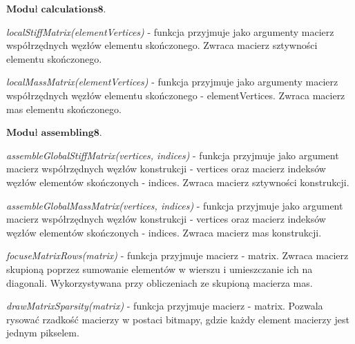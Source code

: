 \vspace {3mm}
 \( \textbf{Moduł calculations8} \).

\vspace {3mm}
\textit{localStiffMatrix(elementVertices)} - funkcja przyjmuje jako argumenty macierz współrzędnych węzłów elementu skończonego. Zwraca macierz sztywności elementu skończonego.

\vspace {3mm}
\textit{localMassMatrix(elementVertices)} - funkcja przyjmuje jako argumenty macierz współrzędnych węzłów elementu skończonego - elementVertices. Zwraca macierz mas elementu skończonego.

\vspace {3mm}
 \( \textbf{Moduł assembling8} \).

\vspace {3mm}
\textit{assembleGlobalStiffMatrix(vertices, indices)} - funkcja przyjmuje jako argument macierz współrzędnych węzłów konstrukcji - vertices oraz macierz indeksów węzłów elementów skończonych - indices. Zwraca macierz sztywności konstrukcji.

\vspace {3mm}
\textit{assembleGlobalMassMatrix(vertices, indices)} - funkcja przyjmuje jako argument macierz współrzędnych węzłów konstrukcji - vertices oraz macierz indeksów węzłów elementów skończonych - indices. Zwraca macierz mas konstrukcji.

\vspace {3mm}
\textit{focuseMatrixRows(matrix)} - funkcja przyjmuje macierz - matrix. Zwraca macierz skupioną poprzez sumowanie elementów w wierszu i umieszczanie ich na diagonali. Wykorzystywana przy obliczeniach ze skupioną macierza mas.

\vspace {3mm}
\textit{drawMatrixSparsity(matrix)} - funkcja przyjmuje macierz - matrix. Pozwala rysować rzadkość macierzy w postaci bitmapy, gdzie każdy element macierzy jest jednym pikselem.
